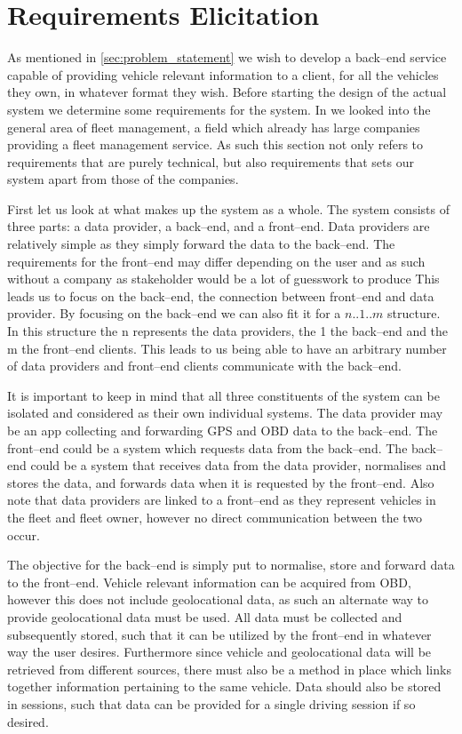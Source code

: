 \section{Requirements Elicitation}\label{sec:requirements_elicitation}
As mentioned in \cref{sec:problem_statement} we wish to develop a back--end service capable of providing vehicle relevant information to a client, for all the vehicles they own, in whatever format they wish.
Before starting the design of the actual system we determine some requirements for the system.
In  we looked into the general area of fleet management, a field which already has large companies providing a fleet management service.
As such this section not only refers to requirements that are purely technical, but also requirements that sets our system apart from those of the companies.

First let us look at what makes up the system as a whole.
The system consists of three parts: a data provider, a back--end, and a front--end.
Data providers are relatively simple as they simply forward the data to the back--end.
The requirements for the front--end may differ depending on the user and as such without a company as stakeholder would be a lot of guesswork to produce
This leads us to focus on the back--end, the connection between front--end and data provider.
By focusing on the back--end we can also fit it for a $n..1..m$ structure.
In this structure the n represents the data providers, the 1 the back--end and the m the front--end clients.
This leads to us being able to have an arbitrary number of data providers and front--end clients communicate with the back--end.

It is important to keep in mind that all three constituents of the system can be isolated and considered as their own individual systems.
The data provider may be an app collecting and forwarding GPS and \ac{OBD} data to the back--end.
The front--end could be a system which requests data from the back--end.
The back--end could be a system that receives data from the data provider, normalises and stores the data, and forwards data when it is requested by the front--end.
Also note that data providers are linked to a front--end as they represent vehicles in the fleet and fleet owner, however no direct communication between the two occur.

\bigskip \noindent
The objective for the back--end is simply put to normalise, store and forward data to the front--end.
Vehicle relevant information can be acquired from \ac{OBD}, however this does not include geolocational data, as such an alternate way to provide geolocational data must be used.
All data must be collected and subsequently stored, such that it can be utilized by the front--end in whatever way the user desires.
Furthermore since vehicle and geolocational data will be retrieved from different sources, there must also be a method in place which links together information pertaining to the same vehicle.
Data should also be stored in sessions, such that data can be provided for a single driving session if so desired.

